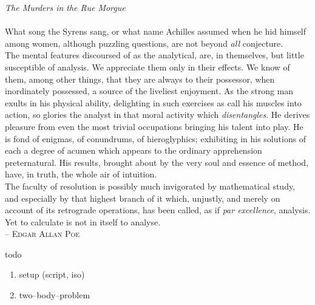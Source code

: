 \documentclass{article}
\begin{document}
\Huge
\textit{The Murders in the Rue Morgue}\\\\
What song the Syrens sang, or what name Achilles assumed when he hid himself among women, although puzzling questions, are not beyond \textit{all} conjecture.\\\indent
The mental features discoursed of as the analytical, are, in themselves, but little susceptible of analysis. 
We appreciate them only in their effects. 
We know of them, among other things, that they are always to their possessor, when inordinately possessed, a source of the liveliest enjoyment.
As the strong man exults in his physical ability, delighting in such exercises as call his muscles into action, so glories the analyst in that moral activity which \textit{disentangles}.
He derives pleasure from even the most trivial occupations bringing his talent into play.
He is fond of enigmas, of conundrums, of hieroglyphics; exhibiting in his solutions of each a degree of acumen which appears to the ordinary apprehension preternatural.
His results, brought about by the very soul and essence of method, have, in truth, the whole air of intuition.\\\indent
The faculty of resolution is possibly much invigorated by mathematical study, and especially by that highest branch of it which, unjustly, and merely on account of its retrograde operations, has been called, as if \textit{par excellence}, analysis. 
Yet to calculate is not in itself to analyse.\\
\null\hfill -- \textsc{Edgar Allan Poe}


\color{fg}

\vfill

\noindent todo
\begin{enumerate}[label=--]
        \item setup (script, iso)
        \item two--body--problem
\end{enumerate}
\end{document}
